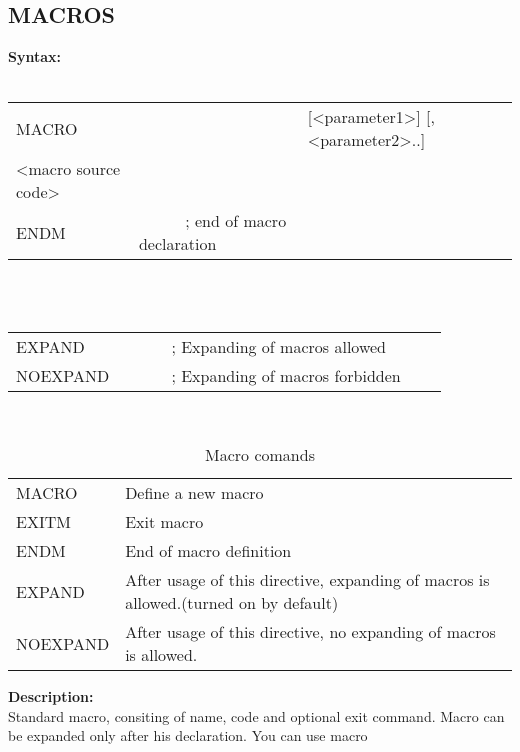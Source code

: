         \subsection{MACROS}
        \textbf{Syntax:}\\
        \\ {
            \texttt{}
                \begin{tabular}[h!]{llll}
                    { \color{highlight_directive} MACRO } & \verb'     ' &
                    { \color{highlight_constant} [<parameter1>]  [,<parameter2>..] }\\
                    { \color{highlight_symbol} <macro source code> }\\
                    { \color{highlight_directive} ENDM } &  \verb'     ' { \color{highlight_comment} ; end of macro declaration  }
                \end{tabular}
            }\\
        \\ {
            \texttt{}
                \begin{tabular}[h!]{llll}
                    { \color{highlight_directive} EXPAND } &  \verb'     ' { \color{highlight_comment} ; Expanding of macros allowed  }\\
                    { \color{highlight_directive} NOEXPAND } &  \verb'     ' { \color{highlight_comment} ; Expanding of macros forbidden  }
                \end{tabular}
            }\\
        \begin{table}[h!]
            \begin{tabular}{|ll|}
                    \hline
                    MACRO      & Define a new macro \\
                    EXITM      & Exit macro  \\
                    ENDM       & End of macro definition \\
                    EXPAND     & After usage of this directive, expanding of macros is allowed.(turned on by default)\\
                    NOEXPAND   & After usage of this directive, no expanding of macros is allowed.\\
                    \hline
            \end{tabular}
            \caption{Macro comands}
        \end{table}
        \textbf{Description:}\\
        Standard macro, consiting of name, code and optional exit command. Macro can be expanded only after his declaration. You can use macro
